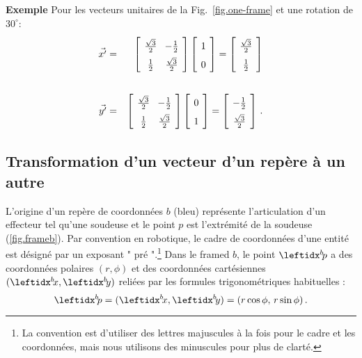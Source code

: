 \noindent\textbf{Exemple} Pour les vecteurs unitaires de la Fig.~\ref{fig.one-frame} et une rotation de $30^\circ$:
\begin{eqnarray*}
\vec{x'}&=&\left[\spacearray\begin{array}{cc}\frac{\sqrt{3}}{2}&-\frac{1}{2}\\\frac{1}{2}&\frac{\sqrt{3}}{2}\end{array}\right]
\left[\spacearray\begin{array}{c}1\\0\end{array}\right]=
\left[\spacearray\begin{array}{c}\frac{\sqrt{3}}{2}\\\frac{1}{2}\end{array}\right]\\
\,\\
\vec{y'}&=&\left[\spacearray\begin{array}{cc}\frac{\sqrt{3}}{2}&-\frac{1}{2}\\\frac{1}{2}&\frac{\sqrt{3}}{2}\end{array}\right]
\left[\spacearray\begin{array}{c}0\\1\end{array}\right]=
\left[\spacearray\begin{array}{c}-\frac{1}{2}\\\frac{\sqrt{3}}{2}\end{array}\right]\,.
\end{eqnarray*}

\subsection{Transformation d'un vecteur d'un repère à un autre}

L'origine d'un repère de coordonnées $b$ (bleu) représente l'articulation d'un effecteur tel qu'une soudeuse et le point $p$ est l'extrémité de la soudeuse (\ref{fig.frameb}). Par convention en robotique, le cadre de coordonnées d'une entité est désigné par un exposant " pré ".\footnote{La convention est d'utiliser des lettres majuscules à la fois pour le cadre et les coordonnées, mais nous utilisons des minuscules pour plus de clarté.}  Dans le framed $b$, le point $\bp$ a des coordonnées polaires $(r,\phi)$ et des coordonnées cartésiennes $(\bx,\by)$ reliées par les formules trigonométriques habituelles :
\[
\bp = (\bx,\by) = (r\cos\phi,\, r\sin\phi)\,.
\]

